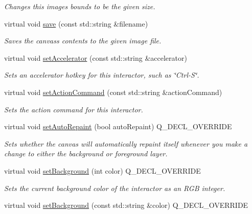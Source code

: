 \begin{DoxyCompactItemize}
\begin{DoxyCompactList}\small\item\em Changes this image\textquotesingle{}s bounds to be the given size. \end{DoxyCompactList}\item 
virtual void \mbox{\hyperlink{classGCanvas_a2c027edbcd25b820dc6e21a9a3ad0496}{save}} (const std\+::string \&filename)
\begin{DoxyCompactList}\small\item\em Saves the canvas\textquotesingle{}s contents to the given image file. \end{DoxyCompactList}\item 
virtual void \mbox{\hyperlink{classGInteractor_ad15f102f62e2960576012f1aa0ba4b2e}{set\+Accelerator}} (const std\+::string \&accelerator)
\begin{DoxyCompactList}\small\item\em Sets an accelerator hotkey for this interactor, such as \char`\"{}\+Ctrl-\/\+S\char`\"{}. \end{DoxyCompactList}\item 
virtual void \mbox{\hyperlink{classGInteractor_a4b5843fe3030e038a1ba54cc03389bcf}{set\+Action\+Command}} (const std\+::string \&action\+Command)
\begin{DoxyCompactList}\small\item\em Sets the action command for this interactor. \end{DoxyCompactList}\item 
virtual void \mbox{\hyperlink{classGCanvas_ade731c276cd0bcd37639280d06571333}{set\+Auto\+Repaint}} (bool auto\+Repaint) Q\+\_\+\+D\+E\+C\+L\+\_\+\+O\+V\+E\+R\+R\+I\+DE
\begin{DoxyCompactList}\small\item\em Sets whether the canvas will automatically repaint itself whenever you make a change to either the background or foreground layer. \end{DoxyCompactList}\item 
virtual void \mbox{\hyperlink{classGCanvas_a427fefbbc34e39e5df27a807da488e0d}{set\+Background}} (int color) Q\+\_\+\+D\+E\+C\+L\+\_\+\+O\+V\+E\+R\+R\+I\+DE
\begin{DoxyCompactList}\small\item\em Sets the current background color of the interactor as an R\+GB integer. \end{DoxyCompactList}\item 
virtual void \mbox{\hyperlink{classGCanvas_a222fcfb542aa6094c7e0de671bd69627}{set\+Background}} (const std\+::string \&color) Q\+\_\+\+D\+E\+C\+L\+\_\+\+O\+V\+E\+R\+R\+I\+DE

\end{DoxyCompactItemize}

